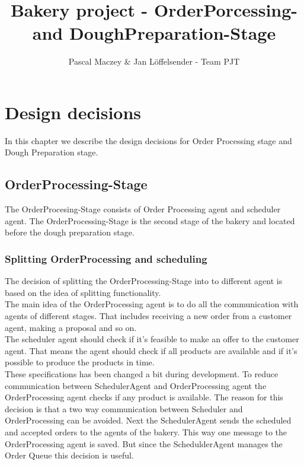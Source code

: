 \documentclass[10pt,a4paper]{article}
\author{Pascal Maczey \& Jan L\"offelsender - Team PJT}
\title{Bakery project - OrderPorcessing- and DoughPreparation-Stage}
\begin{document}
	\maketitle
	\newpage
	\tableofcontents
	\newpage
	
	
	\section{Design decisions}
    In this chapter we describe the design decisions for Order Processing stage and Dough Preparation stage.
	\subsection{OrderProcessing-Stage}
    The OrderProcesing-Stage consists of Order Processing agent and scheduler agent. The OrderProcessing-Stage is the second stage of the bakery and located before
    the dough preparation stage.
	\subsubsection{Splitting OrderProcessing and scheduling}
	The decision of splitting the OrderProcessing-Stage into to different agent is based on the idea of splitting functionality.
	\\
	The main idea of the OrderProcessing agent is to do all the communication with agents of different stages. That includes receiving a new order from a customer agent, making a proposal and so on.
	\\
	The scheduler agent should check if it's feasible to make an offer to the customer agent. That means the agent should check if all products are available and if it's possible to produce the products in time.
	\\
	These specifications has been changed a bit during development. To reduce communication between SchedulerAgent and OrderProcessing agent the OrderProcessing agent checks if any product is available. The reason for this decision is that a two way communication between Scheduler and OrderProcessing can be avoided. Next the SchedulerAgent sends the scheduled and accepted orders to the agents of the bakery. This way one message to the OrderProcessing agent is saved. But since the SchedulderAgent manages the Order Queue this decision is useful.
	
\end{document}
